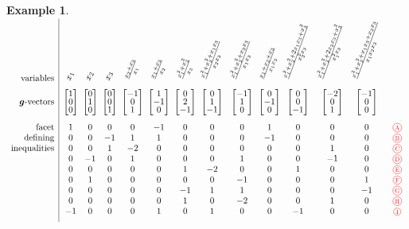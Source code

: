 \documentclass{amsart}
\theoremstyle{definition}
\newtheorem{example}[theorem]{Example}
\renewcommand{\b}[1]{{\boldsymbol{#1}}} %
\newcommand{\red}{\color{red}} %
\newcommand*\circled[1]{\tikz[baseline=(char.base)]{\node[shape=circle, draw, inner sep=1.5pt, scale=.7] (char) {#1};}}
\newcommand{\compactVectorT}[3]{\begin{bmatrix} #1 \\[-.1cm] #2 \\[-.1cm] #3 \end{bmatrix}}
\begin{document}
\begin{example}
\centerline{$
\begin{array}{r|c@{\;\;}c@{\;\;}c@{\;\;}c@{\;\;}c@{\;\;}c@{\;}c@{\;}c@{\;}c@{}c@{}c@{}cc}
\text{variables} & \rotatebox{70}{$x_1$} & \rotatebox{70}{$x_2$} & \rotatebox{70}{$x_3$} & \rotatebox{70}{$\frac{x_2 + x_3}{x_1}$} & \rotatebox{70}{$\frac{x_1 + x_3}{x_2}$} & \rotatebox{70}{$\frac{x_1^2 + x_2^2}{x_3}$} & \rotatebox{70}{$\frac{x_1^2 + x_2^2 + x_1 x_3}{x_2 x_3}$} & \rotatebox{70}{$\frac{x_1^2 + x_2^2 + x_2 x_3}{x_1 x_3}$} & \rotatebox{70}{$\frac{x_1 + x_2 + x_3}{x_1 x_2}$} & \rotatebox{70}{$\frac{x_1^2 + x_2^2 + 2 x_1 x_3 + x_3^2}{x_2^2 x_3}$} & \rotatebox{70}{$\frac{x_1^2 + x_2^2 + 2 x_2 x_3 + x_3^2}{x_1^2 x_3}$} & \rotatebox{70}{$\frac{x_1^2 + x_2^2 + x_1 x_3 + x_2 x_3}{x_1 x_2 x_3}$} \\[.2cm]
\text{$\b{g}$-vectors} & \compactVectorT{1}{0}{0} & \compactVectorT{0}{1}{0} & \compactVectorT{0}{0}{1} & \compactVectorT{-1}{0}{1} & \compactVectorT{1}{-1}{0} & \compactVectorT{0}{2}{-1} & \compactVectorT{0}{1}{-1} & \compactVectorT{-1}{1}{0} & \compactVectorT{0}{-1}{0} & \compactVectorT{0}{0}{-1} & \compactVectorT{-2}{0}{1} & \compactVectorT{-1}{0}{0}  \\[.6cm]
\text{facet}		& 1 & 0 & 0 & 0 & -1 & 0 & 0 & 0 & 1 & 0 & 0 & 0 & \red \circled{A} \\
\text{defining}		& 0 & 0 & -1 & 1 & 1 & 0 & 0 & 0 & -1 & 0 & 0 & 0 & \red \circled{B} \\
\text{inequalities}	& 0 & 0 & 1 & -2 & 0 & 0 & 0 & 0 & 0 & 0 & 1 & 0 & \red \circled{C} \\
					& 0 & -1 & 0 & 1 & 0 & 0 & 0 & 1 & 0 & 0 & -1 & 0 & \red \circled{D} \\
					& 0 & 0 & 0 & 0 & 0 & 1 & -2 & 0 & 0 & 1 & 0 & 0 & \red \circled{E} \\
					& 0 & 1 & 0 & 0 & 0 & 0 & 0 & -1 & 0 & 0 & 0 & 1 & \red \circled{F} \\
					& 0 & 0 & 0 & 0 & 0 & -1 & 1 & 1 & 0 & 0 & 0 & -1 & \red \circled{G} \\
					& 0 & 0 & 0 & 0 & 0 & 1 & 0 & -2 & 0 & 0 & 1 & 0 & \red \circled{H} \\
					& -1 & 0 & 0 & 0 & 1 & 0 & 1 & 0 & 0 & -1 & 0 & 0 & \red \circled{I} \\[.2cm]
\end{array}
$}




\end{example}
\end{document}
